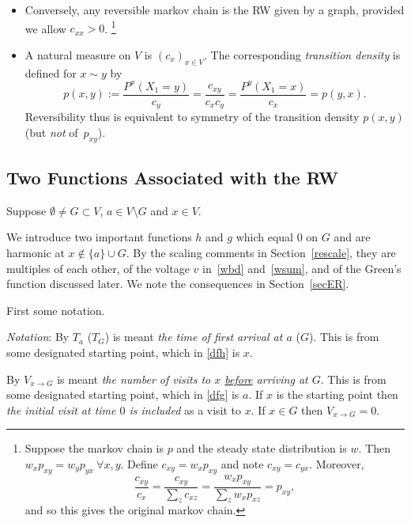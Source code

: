 \documentclass[a4paper]{amsart}
\theoremstyle{plain}
\theoremstyle{definition}
\theoremstyle{remark}
\begin{document}
\begin{itemize}
  The following equivalent version does not explicitly refer to the steady state distribution.  For any path $ x_0 x_1 \dots x_n $
  and beginning at each end respectively, 
  \[  c_{x_0} P^{x_0}( x_0 x_1 \dots x_n ) =  c_{x_n} P^{x_n}( x_n  \dots x_1x_0 ). \]
  
  \item Conversely, any reversible markov chain is the RW given by a graph, provided we allow $ c_{xx}> 0 $.%
  \footnote{Suppose the markov chain is $ p $ and the steady state distribution is $ w $. Then $ w_x p_{xy} = w_y p_{yx} \ \forall x,y $.  Define $ c_{xy} = w_x p_{xy} $ and note $ c_{xy} = c_{yx} $. Moreover,
  \[ \frac{c_{xy}}{c_x} = \frac{c_{xy}}{\sum_z c_{xz}} = \frac{w_x p_{xy}}{\sum_z w_x p_{xz}} = p_{xy}, \]
  and so this gives the original markov chain.
  }
  
  \item A natural measure on $ V $  is $ (c_x)_{x\in V} $.  The corresponding \emph{transition density}  is defined  for $ x \sim y $ by  
  \[  p(x,y) := \frac{P^x(X_1=y) }{c_y}   = \frac{c_{xy}}{c_x c_y} = \frac{P^y(X_1=x) }{c_x}  = p(y,x).\]
  Reversibility thus is equivalent to symmetry of the transition density $ p(x,y) $ (but \emph{not} of~$ p_{xy} $). 
\end{itemize} 
 
\subsection{Two Functions Associated with the RW}  Suppose $ \emptyset \neq G \subset V $, $ a \in V \setminus G $ and $ x \in V $.  

We introduce two important  functions $ h $ and $ g $ which  equal 0 on $ G $ and are harmonic at $ x \notin \{a\}\cup G $. By the scaling comments in  Section~\ref{rescale}, they are multiples of each other, of the voltage $ v $ in~\eqref{wbd} and~\eqref{wsum}, and of the Green's function discussed later.   We note the consequences in Section~\ref{secER}.  

First some notation.

\medskip
\emph{Notation}:  By $ T_a $ ($ T_G $) is meant \emph{the time of first arrival at $ a $}  ($ G $).  This is from some designated starting point, which in \eqref{dfh} is $ x $.   

By $ V_{x\to G} $ is meant \emph{the number of  visits to $ x $ \underline{before} arriving at $ G $}.     This is from some designated starting point, which in \eqref{dfg} is $ a $.   
 If $ x   $ is the starting point then \emph{the initial visit at time $ 0 $ is included} as a visit to $ x $.  If $ x \in G$ then $ V_{x\to G} = 0 $.
\end{document}
